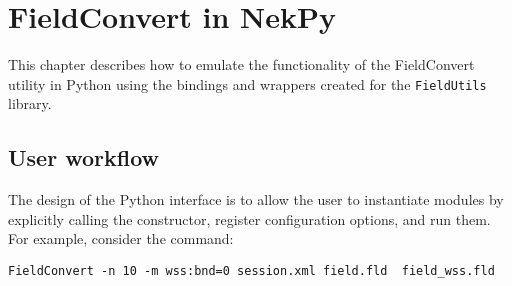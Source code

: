\chapter{FieldConvert in NekPy}

This chapter describes how to emulate the functionality of the FieldConvert utility in Python using the bindings and wrappers created for the \verb+FieldUtils+ library.





\section{User workflow}

The design of the Python interface is to allow the user to instantiate modules by explicitly calling the constructor, register configuration options, and run them. For example, consider the command:

\begin{lstlisting}[style=BashInputStyle]
FieldConvert -n 10 -m wss:bnd=0 session.xml field.fld  field_wss.fld
\end{lstlisting}


